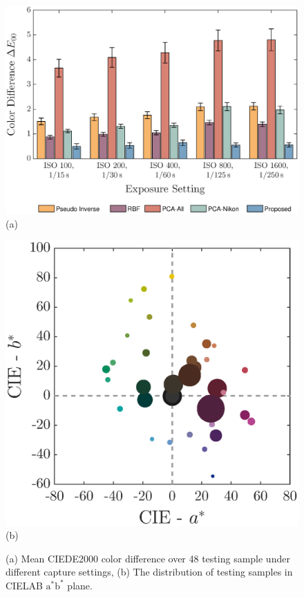 \documentclass[9pt,twocolumn,twoside]{osajnl}
\begin{document}
	\begin{figure}[tbp]
		\centering
		\begin{minipage}[b]{0.57\linewidth}
			\centering
			\includegraphics[width=\linewidth]{Fig13a}\\
			(a)
		\end{minipage}%
		\begin{minipage}[b]{0.43\linewidth}
			\centering
			\includegraphics[width=\linewidth]{Fig13b}\\
			(b)
		\end{minipage}
		\caption{(a) Mean CIEDE2000 color difference over 48 testing sample under different capture settings, (b) The distribution of testing samples in CIELAB $\text{a}^*\text{b}^*$ plane.}
		\label{fig:13}
	\end{figure}
	
\end{document}
